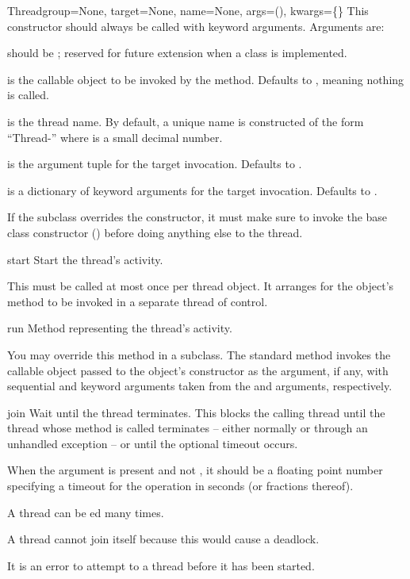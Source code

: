 \begin{classdesc}{Thread}{group=None, target=None, name=None,
                          args=(), kwargs=\{\}}
This constructor should always be called with keyword
arguments.  Arguments are:

 should be ; reserved for future extension when
a  class is implemented.

 is the callable object to be invoked by the
 method.  Defaults to , meaning nothing is
called.

 is the thread name.  By default, a unique name is
constructed of the form ``Thread-'' where  is a small
decimal number.

 is the argument tuple for the target invocation.  Defaults
to \code{()}.

 is a dictionary of keyword arguments for the target
invocation.  Defaults to \code{\{\}}.

If the subclass overrides the constructor, it must make sure
to invoke the base class constructor ()
before doing anything else to the thread.
\end{classdesc}

\begin{methoddesc}{start}{}
Start the thread's activity.

This must be called at most once per thread object.  It
arranges for the object's  method to be invoked in a
separate thread of control.
\end{methoddesc}

\begin{methoddesc}{run}{}
Method representing the thread's activity.

You may override this method in a subclass.  The standard
 method invokes the callable object passed to the
object's constructor as the  argument, if any, with
sequential and keyword arguments taken from the  and
 arguments, respectively.
\end{methoddesc}

\begin{methoddesc}{join}{}
Wait until the thread terminates.
This blocks the calling thread until the thread whose 
method is called terminates -- either normally or through an
unhandled exception -- or until the optional timeout occurs.

When the  argument is present and not , it
should be a floating point number specifying a timeout for the
operation in seconds (or fractions thereof).

A thread can be ed many times.

A thread cannot join itself because this would cause a
deadlock.

It is an error to attempt to  a thread before it has
been started.
\end{methoddesc}

